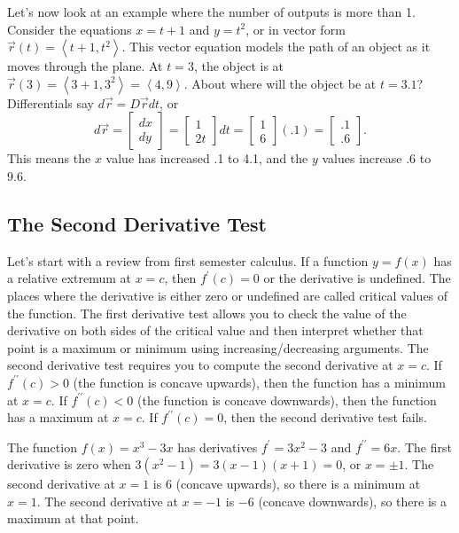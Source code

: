 \documentclass[10pt]{article}
\begin{document}
Let's now look at an example where the number of outputs is more than 1. Consider the equations $x=t+1$ and $y=t^2$, or in vector form $\vec r(t) = \left<t+1,t^2\right>$. This vector equation models the path of an object as it moves through the plane.  At $t=3$, the object is at $\vec r(3) = \left<3+1,3^2\right> =   \left<4,9\right>.$ About where will the object be at $t=3.1$? Differentials say $d\vec r = D\vec r dt$, or 
$$d\vec r
=\begin{bmatrix}dx \\ dy \end{bmatrix} 
=  \begin{bmatrix}1 \\ 2t \end{bmatrix}dt 
=  \begin{bmatrix}1 \\ 6 \end{bmatrix}(.1) 
=  \begin{bmatrix}.1 \\ .6 \end{bmatrix} .
$$
This means the $x$ value has increased .1 to 4.1, and the $y$ values increase .6 to 9.6.









\subsection{The Second Derivative Test}
Let's start with a review from first semester calculus. If a function $y=f(x)$ has a relative extremum at $x=c$, then $f^\prime(c)=0$ or the derivative is undefined. The places where the derivative is either zero or undefined are called critical values of the function. The first derivative test allows you to check the value of the derivative on both sides of the critical value and then interpret whether that point is a maximum or minimum using increasing/decreasing arguments.  The second derivative test requires you to compute the second derivative at $x=c$. If $f^{\prime\prime}(c)>0$ (the function is concave upwards), then the function has a minimum at $x=c$. If $f^{\prime\prime}(c)<0$ (the function is concave downwards), then the function has a maximum at $x=c$. If $f^{\prime\prime}(c)=0$, then the second derivative test fails. 

The function $f(x) = x^3-3x$ has derivatives $f^\prime = 3x^2-3$ and $f^{\prime\prime}=6x$.  The first derivative is zero when $3(x^2-1)=3(x-1)(x+1)=0$, or $x=\pm 1$.  The second derivative at $x=1$ is $6$ (concave upwards), so there is a minimum at $x=1$.  The second derivative at $x=-1$ is $-6$ (concave downwards), so there is a maximum at that point. 
\end{document}
